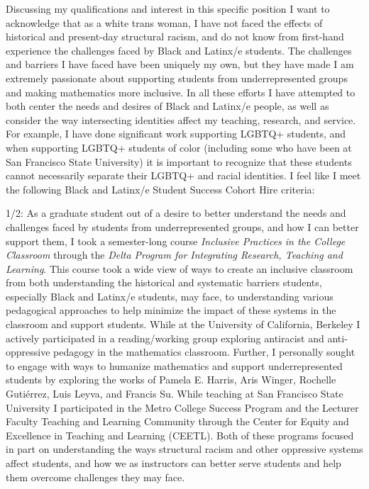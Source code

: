 \documentclass[11pt]{article}
\begin{document}
Discussing my qualifications and interest in this specific position I want to acknowledge that as a white trans woman, I have not faced the effects of historical and present-day structural racism, and do not know from first-hand experience the challenges faced by Black and Latinx/e students. The challenges and barriers I have faced have been uniquely my own, but they have made I am extremely passionate about supporting students from underrepresented groups and making mathematics more inclusive. In all these efforts I have attempted to both center the needs and desires of Black and Latinx/e people, as well as consider the way intersecting identities affect my teaching, research, and service. For example, I have done significant work supporting LGBTQ+ students, and when supporting LGBTQ+ students of color (including some who have been at San Francisco State University) it is important to recognize that these students cannot necessarily separate their LGBTQ+ and racial identities. I feel like I meet the following Black and Latinx/e Student Success Cohort Hire criteria:

1/2: As a graduate student out of a desire to better understand the needs and challenges faced by students from underrepresented groups, and how I can better support them, I took a semester-long course \textit{Inclusive Practices in the College Classroom} through the \textit{Delta Program for Integrating Research, Teaching and Learning}. This course took a wide view of ways to create an inclusive classroom from both understanding the historical and systematic barriers students, especially Black and Latinx/e students, may face, to understanding various pedagogical approaches to help minimize the impact of these systems in the classroom and support students. While at the University of California, Berkeley I actively participated in a reading/working group exploring antiracist and anti-oppressive pedagogy in the mathematics classroom. Further, I personally sought to engage with ways to humanize mathematics and support underrepresented students by exploring the works of Pamela E. Harris, Aris Winger, Rochelle Guti\'{e}rrez, Luis Leyva, and Francis Su. While teaching at San Francisco State University I participated in the Metro College Success Program and the Lecturer Faculty Teaching and Learning Community through the Center for Equity and Excellence in Teaching and Learning (CEETL). Both of these programs focused in part on understanding the ways structural racism and other oppressive systems affect students, and how we as instructors can better serve students and help them overcome challenges they may face. 
\end{document}

